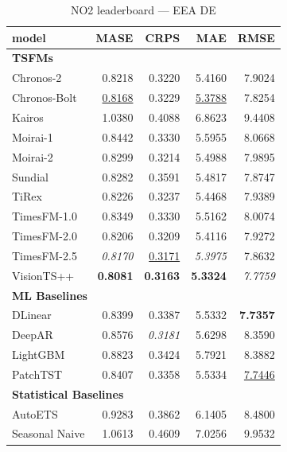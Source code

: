 \begin{table}[H]
\caption{NO2 leaderboard --- EEA DE}
\centering
\begin{small}
\begin{tabular}{lrrrr}
\toprule
model & MASE & CRPS & MAE & RMSE \\
\midrule
\multicolumn{5}{l}{\textbf{TSFMs}} \\
Chronos-2 & 0.8218 & 0.3220 & 5.4160 & 7.9024 \\
Chronos-Bolt & \underline{0.8168} & 0.3229 & \underline{5.3788} & 7.8254 \\
Kairos & 1.0380 & 0.4088 & 6.8623 & 9.4408 \\
Moirai-1 & 0.8442 & 0.3330 & 5.5955 & 8.0668 \\
Moirai-2 & 0.8299 & 0.3214 & 5.4988 & 7.9895 \\
Sundial & 0.8282 & 0.3591 & 5.4817 & 7.8747 \\
TiRex & 0.8226 & 0.3237 & 5.4468 & 7.9389 \\
TimesFM-1.0 & 0.8349 & 0.3330 & 5.5162 & 8.0074 \\
TimesFM-2.0 & 0.8206 & 0.3209 & 5.4116 & 7.9272 \\
TimesFM-2.5 & \textit{0.8170} & \underline{0.3171} & \textit{5.3975} & 7.8632 \\
VisionTS++ & \textbf{0.8081} & \textbf{0.3163} & \textbf{5.3324} & \textit{7.7759} \\
\midrule
\multicolumn{5}{l}{\textbf{ML Baselines}} \\
DLinear & 0.8399 & 0.3387 & 5.5332 & \textbf{7.7357} \\
DeepAR & 0.8576 & \textit{0.3181} & 5.6298 & 8.3590 \\
LightGBM & 0.8823 & 0.3424 & 5.7921 & 8.3882 \\
PatchTST & 0.8407 & 0.3358 & 5.5334 & \underline{7.7446} \\
\midrule
\multicolumn{5}{l}{\textbf{Statistical Baselines}} \\
AutoETS & 0.9283 & 0.3862 & 6.1405 & 8.4800 \\
Seasonal Naive & 1.0613 & 0.4609 & 7.0256 & 9.9532 \\
\bottomrule
\end{tabular}
\end{small}
\end{table}